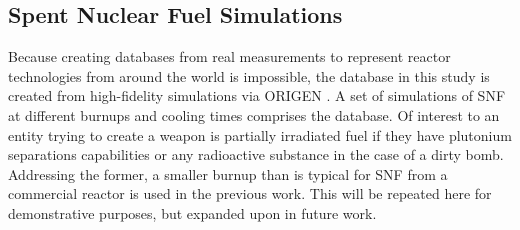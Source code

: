 \subsection{Spent Nuclear Fuel Simulations}
\label{sec:snfsim}

Because creating databases from real measurements to represent reactor
technologies from around the world is impossible, the database in this study is
created from high-fidelity simulations via \gls{ORIGEN} \cite{origen}.  A set
of simulations of \gls{SNF} at different burnups and cooling times comprises
the database.  Of interest to an entity trying to create a weapon is partially
irradiated fuel if they have plutonium separations capabilities or any
radioactive substance in the case of a dirty bomb.  Addressing the former, a
smaller burnup than is typical for \gls{SNF} from a commercial reactor is used
in the previous work. This will be repeated here for demonstrative purposes,
but expanded upon in future work.

